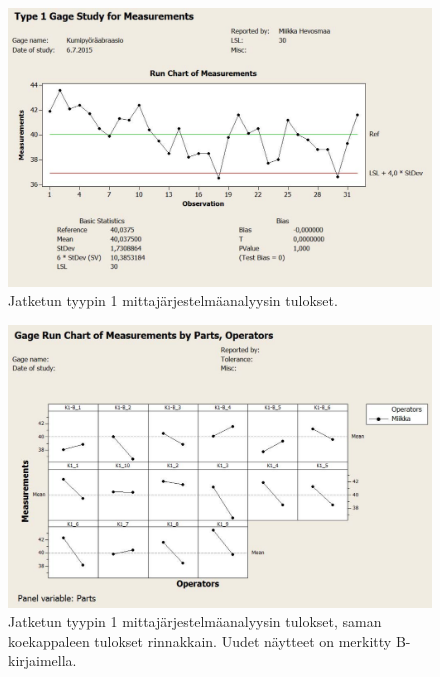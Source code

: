 \documentclass[12pt,a4paper,finnish]{tutthesis}
\begin{document}
\begin{figure}
  \begin{center}
    \includegraphics[width=1.0\textwidth]{t1grrjt}
  \end{center}
  \caption[Jatketun tyypin 1 mittajärjestelmäanalyysin tulokset]{Jatketun tyypin 1 mittajärjestelmäanalyysin tulokset.}
  \label{fig:t1grrjt}
\end{figure}

\begin{figure}
  \begin{center}
    \includegraphics[width=1.0\textwidth]{t1grrjt2}
  \end{center}
  \caption[Jatketun tyypin 1 mittajärjestelmäanalyysin tulokset rinnakkain]{Jatketun tyypin 1 mittajärjestelmäanalyysin tulokset, saman koekappaleen tulokset rinnakkain. Uudet näytteet on merkitty B-kirjaimella.}
  \label{fig:t1grrjt2}
\end{figure}
\end{document}
